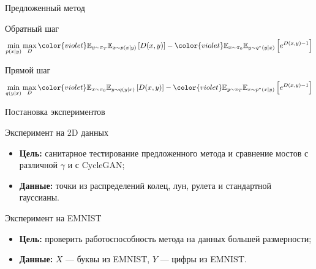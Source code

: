 \documentclass{beamer}
\begin{document}
\begin{frame}{Предложенный метод}
    ~\\[-1mm]
    
    \begin{block}{\color{red}Обратный шаг}
        \begin{displaymath}
            \min_{p(x|y)}\max_{D}{\color{violet}\mathbb{E}_{y \sim \pi_T}\mathbb{E}_{x\sim p(x|y)}}\left[D(x,y)\right] - {\color{violet}\mathbb{E}_{x\sim\pi_0}\mathbb{E}_{y\sim q^*(y|x)}}\left[e^{D(x,y) - 1}\right]
        \end{displaymath}
    \end{block}
    \begin{block}{\color{blue}Прямой шаг}
        \begin{displaymath}
            \min_{q(y|x)}\max_{D}{\color{violet}\mathbb{E}_{x \sim \pi_0}\mathbb{E}_{y\sim q(y|x)}}\left[D(x,y)\right] - {\color{violet}\mathbb{E}_{y\sim\pi_T}\mathbb{E}_{x\sim p^*(x|y)}}\left[e^{D(x,y) - 1}\right]
        \end{displaymath}
    \end{block}
    
\end{frame}
\begin{frame}{Постановка экспериментов}
    \begin{block}{Эксперимент на 2D данных}
        \begin{itemize}
            \item \textbf{Цель:} санитарное тестирование предложенного метода и сравнение мостов с различной $\gamma$ и с CycleGAN;
            \item \textbf{Данные:} точки из распределений колец, лун, рулета и стандартной гауссианы.
        \end{itemize}
    \end{block}
    \begin{block}{Эксперимент на EMNIST}
        \begin{itemize}
            \item \textbf{Цель:} проверить работоспособность метода на данных большей размерности;
            \item \textbf{Данные:} $X$ --- буквы из EMNIST, $Y$  --- цифры из EMNIST.
        \end{itemize}
    \end{block}
\end{frame}
\end{document}

